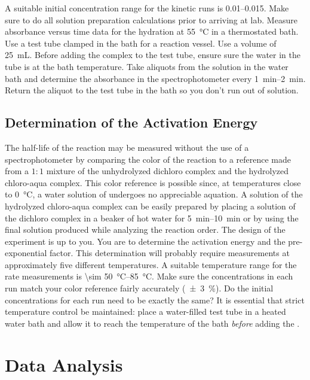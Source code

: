 A suitable initial concentration range for the kinetic runs is \qtyrange{0.01}{0.015}{\Molar}. 
Make sure to do all solution preparation calculations prior to arriving at lab. 
Measure absorbance versus time data for the hydration at \qty{55}{\celsius} in a thermostated bath. 
Use a test tube clamped in the bath for a reaction vessel.
Use a volume of \qty{25}{\mL}. Before adding the complex to the test tube, ensure sure the water in the tube is at the bath temperature. 
Take aliquots from the solution in the water bath and determine the absorbance in the spectrophotometer every \qtyrange{1}{2}{\minute}. 
Return the aliquot to the test tube in the bath so you don't run out of solution. 

\subsection{Determination of the Activation Energy}

The half-life of the reaction may be measured without the use of a spectrophotometer by comparing the color of the reaction to a reference made from a \(1{:}1\) mixture of the unhydrolyzed dichloro complex and the hydrolyzed chloro-aqua complex. 
This color reference is possible since, at temperatures close to \qty{0}{\celsius}, a water solution of  undergoes no appreciable aquation. 
A solution of the hydrolyzed chloro-aqua complex can be easily prepared by placing a solution of the dichloro complex in a beaker of hot water for \qtyrange{5}{10}{\minute} or by using the final solution  produced while analyzing the reaction order. 
The design of the experiment is up to you. 
You are to determine the activation energy and the pre-exponential factor. 
This determination will probably require measurements at approximately five different temperatures. 
A suitable temperature range for the rate measurements is \qtyrange{\sim 50}{85}{\celsius}. 
Make sure the concentrations in each run match your color reference fairly accurately (\qty{\pm3}{\percent}). 
Do the initial concentrations for each run need to be exactly the same?
It is essential that strict temperature control be maintained: place a water-filled test tube in a heated water bath and allow it to reach the temperature of the bath \emph{before} adding the . 

\section{Data Analysis}
\label{sec:data_analysis}

